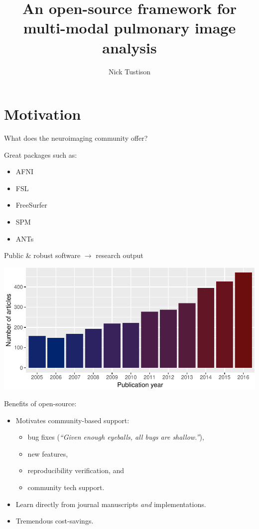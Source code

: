 \documentclass[ignorenonframetext,]{beamer}
\institute{}
\title[Lung imaging and ANTs]{An open-source framework for multi-modal pulmonary image analysis}
\author{Nick Tustison}
\date{}
\providecommand{\tightlist}{%
  \setlength{\itemsep}{0pt}\setlength{\parskip}{0pt}}
\begin{document}
\frame{\titlepage}

\section{Motivation}\label{motivation}

\begin{frame}{What does the neuroimaging community offer?}

Great packages such as:

\begin{itemize}
\tightlist
\item
  AFNI
\item
  FSL
\item
  FreeSurfer
\item
  SPM
\item
  ANTs
\end{itemize}

\end{frame}

\begin{frame}{Public \& robust software \(\longrightarrow\) research
output}

\includegraphics{stitchedIwpiSlides_files/figure-beamer/pubmedQuery-1.pdf}

\end{frame}

\begin{frame}{Benefits of open-source:}

\begin{itemize}
\tightlist
\item
  Motivates community-based support:

  \begin{itemize}
  \tightlist
  \item
    bug fixes (\emph{``Given enough eyeballs, all bugs are shallow.''}),
  \item
    new features,
  \item
    reproducibility verification, and
  \item
    community tech support.
  \end{itemize}
\item
  Learn directly from journal manuscripts \emph{and} implementations.
\item
  Tremendous cost-savings.
\end{itemize}

\end{frame}
\end{document}
